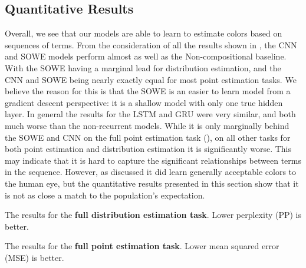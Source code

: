 \documentclass[11pt,a4paper]{article}
\newcommand{\empmodel}{Non-compositional baseline}
\begin{document}
\subsection{Quantitative Results}\label{sec:quantitative-results}

Overall, we see that our models are able to learn to estimate colors based on sequences of terms.
From the consideration of all the results shown in , 
the CNN and SOWE models perform almost as well as the \empmodel{}.
With the SOWE having a marginal lead for distribution estimation,
and the CNN and SOWE being nearly exactly equal for most point estimation tasks.
We believe the reason for this is that the SOWE is an easier to learn model from a gradient descent perspective: it is a shallow model with only one true hidden layer.
In general the results for the LSTM and GRU were very similar, and both much worse than the non-recurrent models.
While it is only marginally behind the SOWE and CNN on the full point estimation task (), on all other tasks for both point estimation and distribution estimation it is significantly worse.
This may indicate that it is hard to capture the significant relationships between terms in the sequence.
However, as discussed  it did learn generally acceptable colors to the human eye, but the quantitative results presented in this section show that it is not as close a match to the population's expectation.



\begin{table}
	\caption{\label{tbl:distfull} The results for the \textbf{full distribution estimation task}. Lower perplexity (PP) is better.}
\end{table}



\begin{table}
	\caption{\label{tbl:pointfull} The results for the \textbf{full point estimation task}. Lower mean squared error (MSE) is better.}
\end{table}
\end{document}

